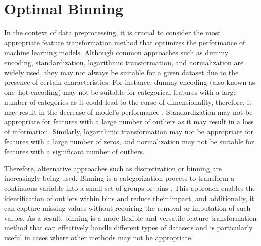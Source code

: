 \section{Optimal Binning}
\label{sec:optbinningtheory}
In the context of data preprocessing, it is crucial to consider the most appropriate feature transformation method that optimizes the performance of machine learning models.
Although common approaches such as dummy encoding, standardization, logarithmic transformation, and normalization are widely used, they may not always be suitable for a given dataset due to the presence of certain characteristics.
For instance, dummy encoding (also known as one--hot encoding) may not be suitable for categorical features with a large number of categories as it could lead to the curse of dimensionality, therefore, it may result in the decrease of model's performance \citep{bera2021dimensionality}.
Standardization may not be appropriate for features with a large number of outliers as it may result in a loss of information.
Similarly, logarithmic transformation may not be appropriate for features with a large number of zeros, and normalization may not be suitable for features with a significant number of outliers.

Therefore, alternative approaches such as discretization or binning are increasingly being used. Binning is a categorization process to transform a continuous variable into a small set of groups or bins \citep{zeng2014necessary}. This approach enables the identification of outliers within bins and reduce their impact, and additionally, it can capture missing values without requiring the removal or imputation of such values.
As a result, binning is a more flexible and versatile feature transformation method that can effectively handle different types of datasets and is particularly useful in cases where other methods may not be appropriate.

